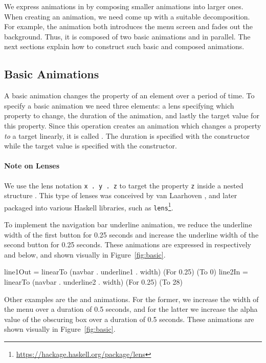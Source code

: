 We express animations in \dsl{} by composing smaller animations into larger
ones. When creating an animation, we need come up with a suitable decomposition.
For example, the  animation both introduces the menu screen and
fades out the background. Thus, it is composed of two basic animations
 and  in parallel. The next sections explain how
to construct such basic and composed animations.

\subsection{Basic Animations}

A basic animation changes the property of an element over a period of time. To
specify a basic animation we need three elements: a lens specifying which
property to change, the duration of the animation, and lastly the target value
for this property. Since this operation creates an animation which changes a
property \emph{to} a target linearly, it is called . The duration
is specified with the  constructor while the target value is specified
with the  constructor.

\paragraph{Note on Lenses} We use the lens notation \texttt{x . y . z} to
target the property \texttt{z} inside a nested structure . This type of lenses was conceived by van Laarhoven
\cite{vlLenses}, and later packaged into
various Haskell libraries, such as
\texttt{lens}\footnote{\url{https://hackage.haskell.org/package/lens}}.

To implement the navigation bar underline animation, we reduce the underline
width of the first button for 0.25 seconds and increase the underline width of
the second button for 0.25 seconds. These animations are expressed in
respectively  and  below, and shown visually in
Figure~\ref{fig:basic}.

\begin{spec}
line1Out = linearTo (navbar . underline1 . width) (For 0.25) (To 0)
line2In = linearTo (navbar . underline2 . width) (For 0.25) (To 28)
\end{spec}

Other examples are the  and  animations. For the
former, we increase the width of the menu over a duration of 0.5 seconds, and
for the latter we increase the alpha value of the obscuring box over a duration
of 0.5 seconds. These animations are shown visually in Figure~\ref{fig:basic}.

